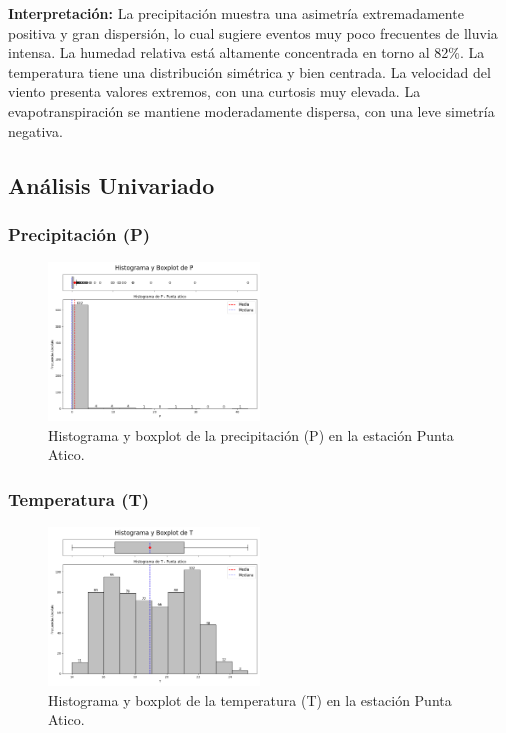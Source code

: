 \textbf{Interpretación:} La precipitación muestra una asimetría extremadamente positiva y gran dispersión, lo cual sugiere eventos muy poco frecuentes de lluvia intensa. La humedad relativa está altamente concentrada en torno al 82\%. La temperatura tiene una distribución simétrica y bien centrada. La velocidad del viento presenta valores extremos, con una curtosis muy elevada. La evapotranspiración se mantiene moderadamente dispersa, con una leve simetría negativa.

\subsection{Análisis Univariado}

\subsubsection*{Precipitación (P)}
\begin{figure}[H]
\centering
\includegraphics[width=0.5\textwidth]{resultados/por_estacion_meteorologica/Punta_Atico/P_histograma.png}
\caption{Histograma y boxplot de la precipitación (P) en la estación Punta Atico.}
\label{fig:punta_atico_P}
\end{figure}

\subsubsection*{Temperatura (T)}
\begin{figure}[H]
\centering
\includegraphics[width=0.5\textwidth]{resultados/por_estacion_meteorologica/Punta_Atico/T_histograma.png}
\caption{Histograma y boxplot de la temperatura (T) en la estación Punta Atico.}
\label{fig:punta_atico_T}
\end{figure}

